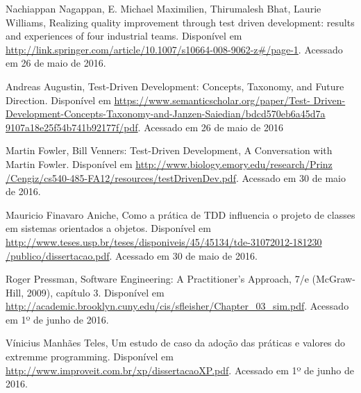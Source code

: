 \documentclass{article}
\begin{document}
  \begin{flushleft}
  Nachiappan Nagappan, E. Michael Maximilien, Thirumalesh Bhat,
  Laurie Williams, Realizing quality improvement through test driven 
  development: results and experiences of four industrial teams. Disponível em
  \url{http://link.springer.com/article/10.1007/s10664-008-9062-z#/page-1}.
  Acessado em 26 de maio de 2016.

  Andreas Augustin, Test-Driven Development: Concepts, Taxonomy, and Future 
  Direction. Disponível em \url{https://www.semanticscholar.org/paper/Test-
  Driven-Development-Concepts-Taxonomy-and-Janzen-Saiedian/bdcd570eb6a45d7a
  9107a18e25f54b741b92177f/pdf}. Acessado em 26 de maio de 2016

  Martin Fowler, Bill Venners: Test-Driven Development, A Conversation with 
  Martin Fowler. Disponível em \url{http://www.biology.emory.edu/research/Prinz
  /Cengiz/cs540-485-FA12/resources/testDrivenDev.pdf}. Acessado em 30 de maio de
  2016.

  Mauricio Finavaro Aniche, Como a prática de TDD influencia o projeto de 
  classes em sistemas orientados a objetos. Disponível em 
  \url{http://www.teses.usp.br/teses/disponiveis/45/45134/tde-31072012-181230
  /publico/dissertacao.pdf}. Acessado em 30 de maio de 2016.

  Roger Pressman, Software Engineering: A Practitioner’s Approach, 7/e 
  (McGraw-Hill, 2009), capítulo 3.  Disponível em
  \url{http://academic.brooklyn.cuny.edu/cis/sfleisher/Chapter_03_sim.pdf}.
  Acessado em 1º de junho de 2016.

  Vínicius Manhães Teles, Um estudo de caso da adoção das práticas e valores do
  extremme programming. Disponível em
  \url{http://www.improveit.com.br/xp/dissertacaoXP.pdf}. Acessado em 1º de 
  junho de 2016.
  
  \end{flushleft}
\end{document}
